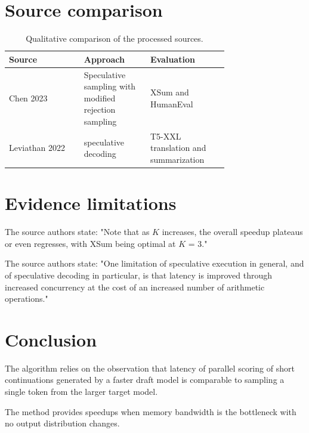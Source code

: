 \documentclass[conference]{IEEEtran}
\begin{document}
\section{Source comparison}
\begin{table}[H]\centering
\caption{Qualitative comparison of the processed sources.}
\begin{tabular}{|>{\raggedright\arraybackslash}p{0.26\linewidth}|>{\raggedright\arraybackslash}p{0.235\linewidth}|>{\raggedright\arraybackslash}p{0.235\linewidth}|}\hline
Source & Approach & Evaluation \\ \hline
Chen 2023 \cite{chen2023accelerating} & Speculative sampling with modified rejection sampling & XSum and HumanEval \\ \hline
Leviathan 2022 \cite{leviathan2022fast} & speculative decoding & T5-XXL translation and summarization \\ \hline
\end{tabular}\end{table}
\section{Evidence limitations}
The source authors state: "Note that as \ensuremath{\mathit{K}}
increases, the overall speedup plateaus or even regresses, with XSum being optimal at \ensuremath{\mathit{K}} = 3." \cite{chen2023accelerating}

The source authors state: "One limitation of speculative execution in general, and of
speculative decoding in particular, is that latency is improved through increased concurrency at the cost of an increased number of arithmetic operations." \cite{leviathan2022fast}

\section{Conclusion}
The algorithm relies on the observation that latency of parallel scoring of short continuations generated by a faster draft model is comparable to sampling a single token from the larger target model. \cite{chen2023accelerating}

The method provides speedups when memory bandwidth is the bottleneck with no output distribution changes. \cite{leviathan2022fast}



\end{document}
